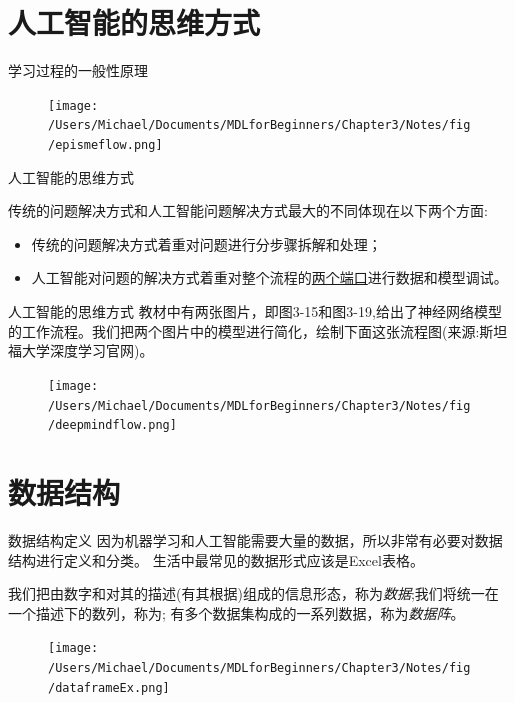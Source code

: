 \documentclass[handout]{beamer}
\begin{document}
\section{人工智能的思维方式}

\begin{frame}{学习过程的一般性原理}
	\begin{figure}[H]
		\centering
		\texttt{[image: /Users/Michael/Documents/MDLforBeginners/Chapter3/Notes/fig/epismeflow.png]}
	\end{figure}
\end{frame}

\begin{frame}{人工智能的思维方式}

传统的问题解决方式和人工智能问题解决方式最大的不同体现在以下两个方面:
	\begin{itemize}
	\setlength\itemsep{1em}
		\item 传统的问题解决方式着重对问题进行分步骤拆解和处理；
		\item 人工智能对问题的解决方式着重对整个流程的\underline{两个端口}进行数据和模型调试。
	\end{itemize}	
\end{frame}

\begin{frame}{人工智能的思维方式}
教材中有两张图片，即图3-15和图3-19,给出了神经网络模型的工作流程。我们把两个图片中的模型进行简化，绘制下面这张流程图(来源:斯坦福大学深度学习官网)。
\begin{figure}[H]
	\centering
	\texttt{[image: /Users/Michael/Documents/MDLforBeginners/Chapter3/Notes/fig/deepmindflow.png]}
\end{figure}
\end{frame}

\section{数据结构}



\begin{frame}{数据结构定义}
	因为机器学习和人工智能需要大量的数据，所以非常有必要对数据结构进行定义和分类。 生活中最常见的数据形式应该是Excel表格。
	\begin{definition}
	我们把由数字和对其的描述(有其根据)组成的信息形态，称为\textit{数据};我们将统一在一个描述下的数列，称为; 有多个数据集构成的一系列数据，称为\textit{数据阵}。
\end{definition}
\begin{figure}[H]
	\centering
	\texttt{[image: /Users/Michael/Documents/MDLforBeginners/Chapter3/Notes/fig/dataframeEx.png]}
\end{figure}
\end{frame}
\end{document}
